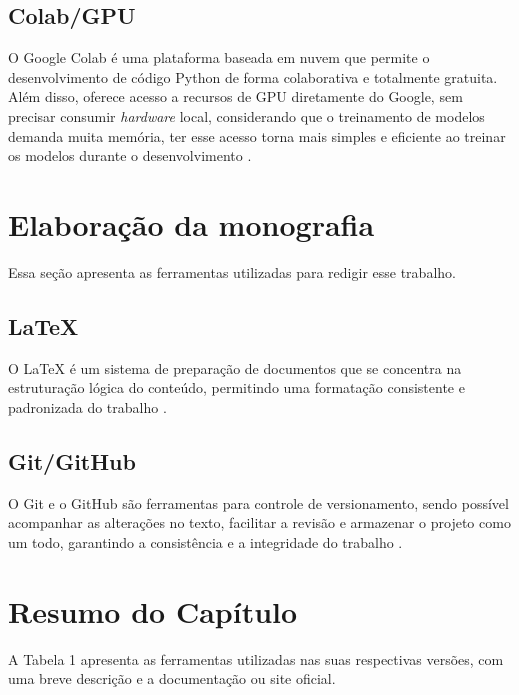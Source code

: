 \subsection{Colab/GPU}\label{subsec:colab}
O Google Colab é uma plataforma baseada em nuvem que permite o desenvolvimento de código Python de forma colaborativa 
e totalmente gratuita. Além disso, oferece acesso a recursos de GPU diretamente do Google, sem precisar consumir 
\textit{hardware} local, considerando que o treinamento de modelos demanda muita memória, ter esse acesso torna mais 
simples e eficiente ao treinar os modelos durante o desenvolvimento \cite{colabsite}.

\section{Elaboração da monografia}\label{sec:elaboracaomono}
Essa seção apresenta as ferramentas utilizadas para redigir esse trabalho.

\subsection{LaTeX}\label{subsec:latex}
O LaTeX é um sistema de preparação de documentos que se concentra na estruturação lógica do conteúdo, permitindo
uma formatação consistente e padronizada do trabalho \cite{latexsite}.

\subsection{Git/GitHub}\label{subsec:git}
O Git e o GitHub são ferramentas para controle de versionamento, sendo possível acompanhar as alterações no texto,
facilitar a revisão e armazenar o projeto como um todo, garantindo a consistência e a integridade do trabalho \cite{githubsite}.

\section{Resumo do Capítulo}\label{sec:resumosuptec}
A Tabela 1 apresenta as ferramentas utilizadas nas suas respectivas versões, com uma breve descrição e a documentação ou site 
oficial.

